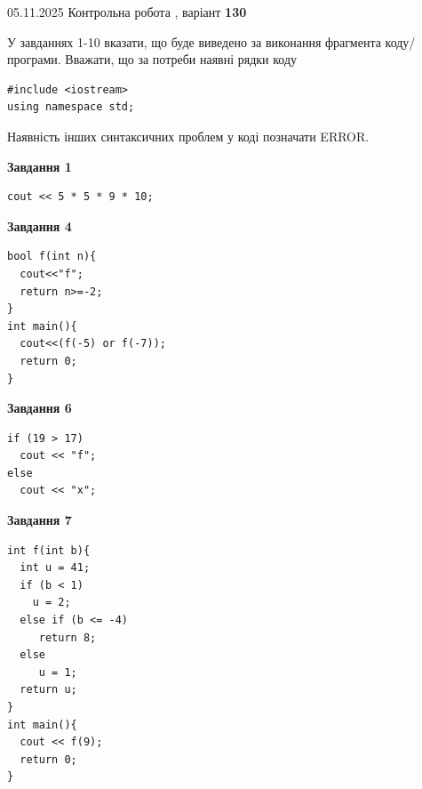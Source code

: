 \documentclass[12pt, ukrainian]{article}
\begin{document}
{\Large{05.11.2025 Контрольна робота , варіант  \No \textbf { 130 }\par}}
{
\begin {large}
У завданнях 1-10 вказати, що буде виведено за виконання фрагмента коду/про\-гра\-ми.
Вважати, що за потреби наявні рядки коду
\begin{verbatim}
#include <iostream>
using namespace std;
\end{verbatim}
Наявність інших синтаксичних проблем у коді позначати ERROR.

\begin{minipage}[t]{7.0cm}

\begin{center}
\textbf{Завдання 1}
\end{center}
\vspace{-8mm}

\begin{verbatim}
cout << 5 * 5 * 9 * 10;
\end{verbatim}



\begin{center}
\textbf{Завдання 4}
\end{center}
\vspace{-8mm}

\begin{verbatim}
bool f(int n){
  cout<<"f";
  return n>=-2;
}
int main(){
  cout<<(f(-5) or f(-7));
  return 0;
}
\end{verbatim}



\begin{center}
\textbf{Завдання 6}
\end{center}
\vspace{-8mm}

\begin{verbatim}
if (19 > 17)
  cout << "f";
else
  cout << "x";
\end{verbatim}



\begin{center}
\textbf{Завдання 7}
\end{center}
\vspace{-8mm}

\begin{verbatim}
int f(int b){
  int u = 41;
  if (b < 1)
    u = 2;
  else if (b <= -4)
     return 8;
  else
     u = 1;
  return u;
}
int main(){
  cout << f(9);
  return 0;
}
\end{verbatim}


\end{minipage}
\end{large}}
\end{document}
